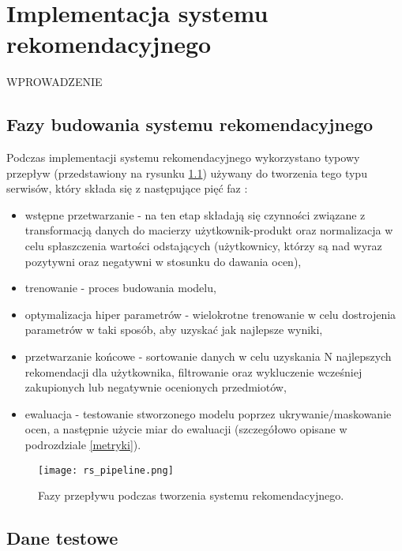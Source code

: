 
\chapter{Implementacja systemu rekomendacyjnego}

WPROWADZENIE

\section{Fazy budowania systemu rekomendacyjnego}

Podczas implementacji systemu rekomendacyjnego wykorzystano typowy przepływ (przedstawiony na rysunku \ref{fig:rs_pipeline}) używany do tworzenia tego typu serwisów, który składa się z następujące pięć faz \cite{rs_in_real}:
\begin{itemize}
    \item wstępne przetwarzanie - na ten etap składają się czynności związane z transformacją danych do macierzy użytkownik-produkt oraz normalizacja w celu spłaszczenia wartości odstających (użytkownicy, którzy są nad wyraz pozytywni oraz negatywni w stosunku do dawania ocen),
    \item trenowanie - proces budowania modelu,
    \item optymalizacja hiper parametrów - wielokrotne trenowanie w celu dostrojenia parametrów w taki sposób, aby uzyskać jak najlepsze wyniki,
    \item przetwarzanie końcowe - sortowanie danych w celu uzyskania N najlepszych rekomendacji dla użytkownika, filtrowanie oraz wykluczenie wcześniej zakupionych lub negatywnie ocenionych przedmiotów,
    \item ewaluacja - testowanie stworzonego modelu poprzez ukrywanie/maskowanie ocen, a następnie użycie miar do ewaluacji (szczegółowo opisane w podrozdziale \ref{metryki}).
\end{itemize}{}

\begin{figure}
    \texttt{[image: rs\_pipeline.png]}
    \caption{Fazy przepływu podczas tworzenia systemu rekomendacyjnego.}
    \label{fig:rs_pipeline}
\end{figure}

\section{Dane testowe}